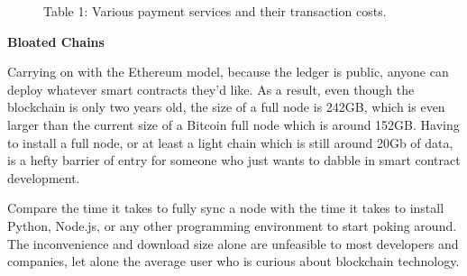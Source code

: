 \documentclass{%
	article}
\begin{document}
\begin{figure}[htbp!]
\centering
{}\par
\medskip
Table 1: Various payment services and their transaction costs.
\end{figure}


\begin{center}
\textbf{Bloated Chains}
\end{center}

Carrying on with the Ethereum model, because the ledger is public, anyone can deploy whatever smart contracts they’d like. As a result, even though the blockchain is only two years old, the size of a full node is 242GB\cite{ethchainsize}, which is even larger than the current size of a Bitcoin full node which is around 152GB\cite{btcchainsize}. Having to install a full node, or at least a light chain which is still around 20Gb of data, is a hefty barrier of entry for someone who just wants to dabble in smart contract development.

Compare the time it takes to fully sync a node with the time it takes to install Python, Node.js, or any other programming environment to start poking around. The inconvenience and download size alone are unfeasible to most developers and companies, let alone the average user who is curious about blockchain technology.
\end{document}
